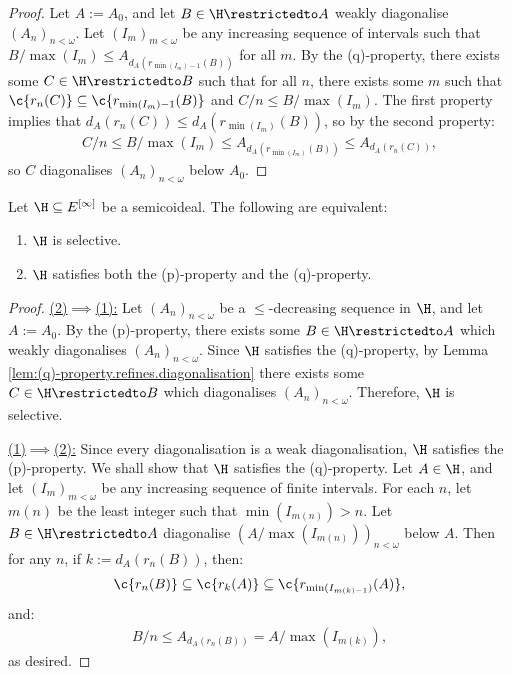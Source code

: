 \documentclass[11pt,reqno]{amsart}
\begin{document}
\begin{proof}
    Let $A := A_0$, and let $B \in \H\restrictedto A$ weakly diagonalise $(A_n)_{n<\omega}$. Let $(I_m)_{m<\omega}$ be any increasing sequence of intervals such that $B/\max(I_m) \leq A_{d_A(r_{\min(I_m)-1}(B))}$ for all $m$. By the (q)-property, there exists some $C \in \H\restrictedto B$ such that for all $n$, there exists some $m$ such that $\c{r_n(C)} \subseteq \c{r_{\min(I_m)-1}(B)}$ and $C/n \leq B/\max(I_m)$. The first property implies that $d_A(r_n(C)) \leq d_A(r_{\min(I_m)}(B))$, so by the second property:
    \begin{align*}
        C/n \leq B/\max(I_m) \leq A_{d_A(r_{\min(I_m)}(B))} \leq A_{d_A(r_n(C))},
    \end{align*}
    so $C$ diagonalises $(A_n)_{n<\omega}$ below $A_0$.
\end{proof}

\begin{proposition}
\label{prop:selective.iff.(p,q)}
    Let $\H \subseteq E^{[\infty]}$ be a semicoideal. The following are equivalent:
    \begin{enumerate}
        \item $\H$ is selective.

        \item $\H$ satisfies both the (p)-property and the (q)-property.
    \end{enumerate}
\end{proposition}

\begin{proof} 
    \underline{(2)$\implies$(1):} Let $(A_n)_{n<\omega}$ be a $\leq$-decreasing sequence in $\H$, and let $A := A_0$. By the (p)-property, there exists some $B \in \H\restrictedto A$ which weakly diagonalises $(A_n)_{n<\omega}$. Since $\H$ satisfies the (q)-property, by Lemma \ref{lem:(q)-property.refines.diagonalisation} there exists some $C \in \H\restrictedto B$ which diagonalises $(A_n)_{n<\omega}$. Therefore, $\H$ is selective.

    \underline{(1)$\implies$(2):} Since every diagonalisation is a weak diagonalisation, $\H$ satisfies the (p)-property. We shall show that $\H$ satisfies the (q)-property. Let $A \in \H$, and let $(I_m)_{m<\omega}$ be any increasing sequence of finite intervals. For each $n$, let $m(n)$ be the least integer such that $\min(I_{m(n)}) > n$. Let $B \in \H\restrictedto A$ diagonalise $(A/\max(I_{m(n)}))_{n<\omega}$ below $A$. Then for any $n$, if $k := d_A(r_n(B))$, then:
    \begin{align*}
        \c{r_n(B)} \subseteq \c{r_k(A)} \subseteq \c{r_{\min(I_{m(k)-1})}(A)},
    \end{align*}
    and:
    \begin{align*}
        B/n \leq A_{d_A(r_n(B))} = A/\max(I_{m(k)}),
    \end{align*}
    as desired.
\end{proof}
\end{document}
